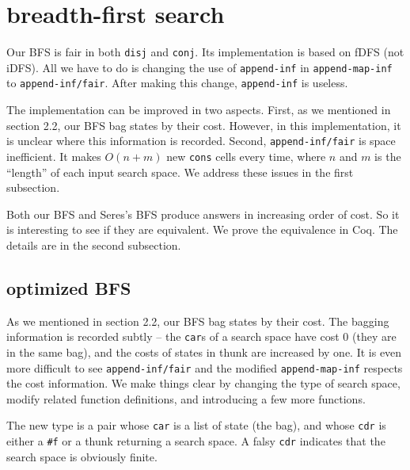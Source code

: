 \documentclass[format=acmlarge, review=true, authordraft=true]{acmart}
\newcommand{\conj}{\texttt{conj}}
\newcommand{\disj}{\texttt{disj}}
\begin{document}
\section{breadth-first search}

Our BFS is fair in both \disj{} and \conj{}. Its implementation is based on fDFS (not iDFS). All we have to do is changing the use of \texttt{append-inf} in \texttt{append-map-inf} to \texttt{append-inf/fair}. After making this change, \texttt{append-inf} is useless.

The implementation can be improved in two aspects. First, as we mentioned in section 2.2, our BFS bag states by their cost. However, in this implementation, it is unclear where this information is recorded. Second, \texttt{append-inf/fair} is space inefficient. It makes $O(n+m)$ new \texttt{cons} cells every time, where $n$ and $m$ is the ``length'' of each input search space. We address these issues in the first subsection.

Both our BFS and Seres's BFS \citep{seres1999algebra} produce answers in increasing order of cost. So it is interesting to see if they are equivalent. We prove the equivalence in Coq. The details are in the second subsection.



\subsection{optimized BFS}

As we mentioned in section 2.2, our BFS bag states by their cost. The bagging information is recorded subtly -- the \texttt{car}s of a search space have cost 0 (they are in the same bag), and the costs of states in thunk are increased by one. It is even more difficult to see \texttt{append-inf/fair} and the modified \texttt{append-map-inf} respects the cost information. We make things clear by changing the type of search space, modify related function definitions, and introducing a few more functions.

The new type is a pair whose \texttt{car} is a list of state (the bag), and whose \texttt{cdr} is either a \texttt{\#{}f} or a thunk returning a search space. A falsy \texttt{cdr} indicates that the search space is obviously finite. 
\end{document}
